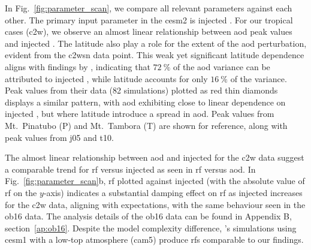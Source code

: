 \documentclass{ametsocV6.1}
\newcommand{\iso}[1][i]{{#1}njected \ce{SO2}}
\begin{document}
In Fig.~\ref{fig:parameter_scan}, we compare all relevant parameters against each other.
The primary input parameter in the \gls{cesm2} is \iso{}. For our tropical cases
(\gls{c2w}), we observe an almost linear relationship between \gls{aod} peak values and
\iso{}. The latitude also play a role for the extent of the \gls{aod} perturbation,
evident from the \gls{c2wsn} data point. This weak yet significant latitude dependence
aligns with findings by \citet{marshall2019}, indicating that \(\SI{72}{\percent}\) of
the \gls{aod} variance can be attributed to \iso{}, while latitude accounts for only
\(\SI{16}{\percent}\) of the variance. Peak values from their data (82 simulations)
plotted as red thin diamonds displays a similar pattern, with \gls{aod} exhibiting close
to linear dependence on \iso{}, but where latitude introduce a spread in \gls{aod}. Peak
values from Mt.\ Pinatubo (P) and Mt.\ Tambora (T) are shown for reference, along with
peak values from \gls{j05} and \gls{t10}.

The almost linear relationship between \gls{aod} and \iso{} for the \gls{c2w} data
suggest a comparable trend for \gls{rf} versus \iso{} as seen in \gls{rf} versus
\gls{aod}. In Fig.~\ref{fig:parameter_scan}b, \gls{rf} plotted against \iso{} (with the
absolute value of \gls{rf} on the \(y\)-axis) indicates a substantial damping effect on
\gls{rf} as \iso{} increases for the \gls{c2w} data, aligning with expectations, with
the same behaviour seen in the \gls{ob16} data. The analysis details of the \gls{ob16}
data can be found in Appendix B, section~\ref{ap:ob16}. Despite the model complexity
difference, \citet{ottobliesner2016}'s simulations using \gls{cesm1} with a low-top
atmosphere (\gls{cam5}) produce \glspl{rf} comparable to our findings.
\end{document}
